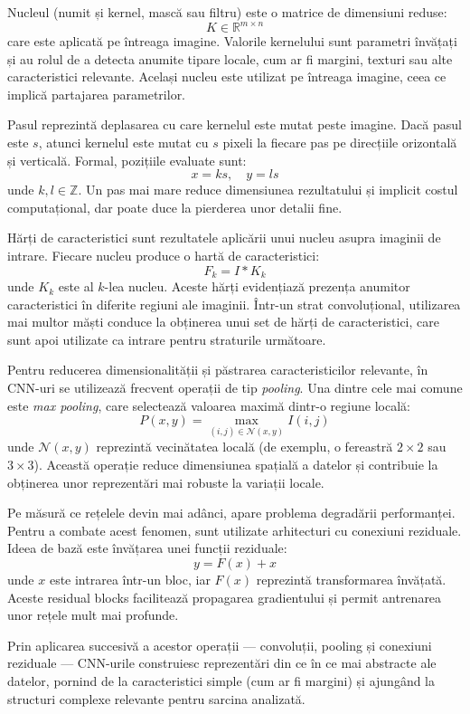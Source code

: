 Nucleul (numit și kernel, mască sau filtru) este o matrice de dimensiuni reduse:
\[
    K \in \mathbb{R}^{m \times n}
\]
care este aplicată pe întreaga imagine. Valorile kernelului sunt parametri învățați și au rolul de a detecta anumite tipare locale, cum ar fi margini, texturi sau alte caracteristici relevante. Același nucleu este utilizat pe întreaga imagine, ceea ce implică partajarea parametrilor.

Pasul reprezintă deplasarea cu care kernelul este mutat peste imagine. Dacă pasul este \( s \), atunci kernelul este mutat cu \( s \) pixeli la fiecare pas pe direcțiile orizontală și verticală. Formal, pozițiile evaluate sunt:
\[
    x = ks, \quad y = ls
\]
unde \( k, l \in \mathbb{Z} \). Un pas mai mare reduce dimensiunea rezultatului și implicit costul computațional, dar poate duce la pierderea unor detalii fine.

Hărți de caracteristici sunt rezultatele aplicării unui nucleu asupra imaginii de intrare. Fiecare nucleu produce o hartă de caracteristici:
\[
    F_k = I * K_k
\]
unde \( K_k \) este al \(k\)-lea nucleu. Aceste hărți evidențiază prezența anumitor caracteristici în diferite regiuni ale imaginii. Într-un strat convoluțional, utilizarea mai multor măști conduce la obținerea unui set de hărți de caracteristici, care sunt apoi utilizate ca intrare pentru straturile următoare.

Pentru reducerea dimensionalității și păstrarea caracteristicilor relevante, în CNN-uri se utilizează frecvent operații de tip \textit{pooling}. Una dintre cele mai comune este \textit{max pooling}, care selectează valoarea maximă dintr-o regiune locală:
\[
    P(x, y) = \max_{(i,j) \in \mathcal{N}(x,y)} I(i,j)
\]
unde \( \mathcal{N}(x,y) \) reprezintă vecinătatea locală (de exemplu, o fereastră \(2 \times 2\) sau \(3 \times 3\)). Această operație reduce dimensiunea spațială a datelor și contribuie la obținerea unor reprezentări mai robuste la variații locale.

Pe măsură ce rețelele devin mai adânci, apare problema degradării performanței. Pentru a combate acest fenomen, sunt utilizate arhitecturi cu conexiuni reziduale. Ideea de bază este învățarea unei funcții reziduale:
\[
    y = F(x) + x
\]
unde \( x \) este intrarea într-un bloc, iar \( F(x) \) reprezintă transformarea învățată. Aceste residual blocks facilitează propagarea gradientului și permit antrenarea unor rețele mult mai profunde.

Prin aplicarea succesivă a acestor operații — convoluții, pooling și conexiuni reziduale — CNN-urile construiesc reprezentări din ce în ce mai abstracte ale datelor, pornind de la caracteristici simple (cum ar fi margini) și ajungând la structuri complexe relevante pentru sarcina analizată.

